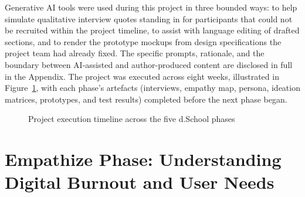 \documentclass[11pt]{article}
\begin{document}
Generative AI tools were used during this project in three bounded ways: to help simulate qualitative interview quotes standing in for participants that could not be recruited within the project timeline, to assist with language editing of drafted sections, and to render the prototype mockups from design specifications the project team had already fixed. The specific prompts, rationale, and the boundary between AI-assisted and author-produced content are disclosed in full in the Appendix. The project was executed across eight weeks, illustrated in Figure~\ref{fig:timeline}, with each phase's artefacts (interviews, empathy map, persona, ideation matrices, prototypes, and test results) completed before the next phase began.

\begin{figure}[h]
\centering
{}
\caption{Project execution timeline across the five d.School phases}
\label{fig:timeline}
\end{figure}

\section{Empathize Phase: Understanding Digital Burnout and User Needs}
\end{document}
